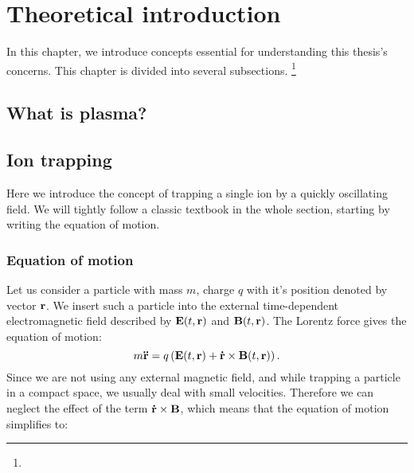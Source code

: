\chapter{Theoretical introduction}
\label{chap:refs}

In this chapter, we introduce concepts essential for understanding this thesis's concerns. This chapter is divided into several subsections. \footnote{} 

\section{What is plasma?}

\section{Ion trapping}
Here we introduce the concept of trapping a single ion by a quickly oscillating field. We will tightly follow a classic textbook \cite{gerlich1992inhomogeneous} in the whole section, starting by writing the equation of motion.
\subsection{Equation of motion}
Let us consider a particle with mass $m$, charge $q$ with it's position denoted by vector $\vb{r}$. We insert such a particle into the external time-dependent electromagnetic field described by $\vb{E}(t,\vb{r})$ and $\vb{B}(t,\vb{r})$. The Lorentz force gives the equation of motion:
\begin{equation}
	m \vb{\ddot{r}} = q \left(\vb{E}(t,\vb{r}) + \vb{\dot{r}} \times \vb{B}(t,\vb{r})\right).
\end{equation}
Since we are not using any external magnetic field, and while trapping a particle in a compact space, we usually deal with small velocities. Therefore we can neglect the effect of the term $\vb{\dot{r}} \times \vb{B}$, which means that the equation of motion simplifies to:

